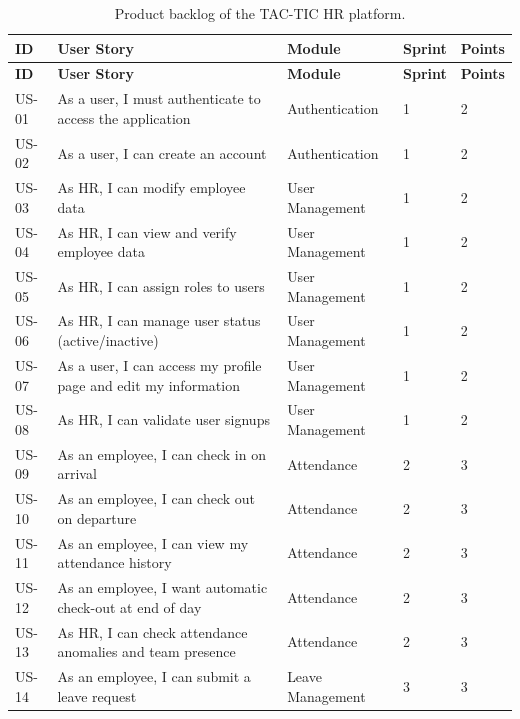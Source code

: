 \begin{longtable}[c]{
    |p{}
    |p{}
    |p{}
    |p{}
    |p{}|
}
    \caption{Product backlog of the TAC-TIC HR platform.}
    \label{tab:product-backlog}\\
    \hline
    \textbf{ID} & \textbf{User Story} & \textbf{Module} & \textbf{Sprint} & \textbf{Points} \\
    \hline
    \endfirsthead
    \hline
    \textbf{ID} & \textbf{User Story} & \textbf{Module} & \textbf{Sprint} & \textbf{Points} \\
    \hline
    \endhead
    \hline
    \endfoot

    US-01 & As a user, I must authenticate to access the application & Authentication & 1 & 2 \\
    \hline
    US-02 & As a user, I can create an account & Authentication & 1 & 2 \\
    \hline
    US-03 & As HR, I can modify employee data & User Management & 1 & 2 \\
    \hline
    US-04 & As HR, I can view and verify employee data & User Management & 1 & 2 \\
    \hline
    US-05 & As HR, I can assign roles to users & User Management & 1 & 2 \\
    \hline
    US-06 & As HR, I can manage user status (active/inactive) & User Management & 1 & 2 \\
    \hline
    US-07 & As a user, I can access my profile page and edit my information & User Management & 1 & 2 \\
    \hline
    US-08 & As HR, I can validate user signups & User Management & 1 & 2 \\
    \hline
    US-09 & As an employee, I can check in on arrival & Attendance & 2 & 3 \\
    \hline
    US-10 & As an employee, I can check out on departure & Attendance & 2 & 3 \\
    \hline
    US-11 & As an employee, I can view my attendance history & Attendance & 2 & 3 \\
    \hline
    US-12 & As an employee, I want automatic check-out at end of day & Attendance & 2 & 3 \\
    \hline
    US-13 & As HR, I can check attendance anomalies and team presence & Attendance & 2 & 3 \\
    \hline
    US-14 & As an employee, I can submit a leave request & Leave Management & 3 & 3 \\

\end{longtable}
